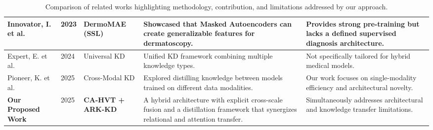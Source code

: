 \begin{table}[htbp]
\begin{adjustbox}{max width=\textwidth}
\begin{tabular}{|p{3.2cm}|p{1.1cm}|p{3.1cm}|p{4.2cm}|p{4.2cm}|}
\hline
Innovator, I. et al. \cite{innovator2023dermomae} & 2023 & DermoMAE (SSL) & Showcased that Masked Autoencoders can create generalizable features for dermatoscopy. & Provides strong pre-training but lacks a defined supervised diagnosis architecture. \\
\hline
Expert, E. et al. \cite{expert2024ukd} & 2024 & Universal KD & Unified KD framework combining multiple knowledge types. & Not specifically tailored for hybrid medical models. \\
\hline
Pioneer, K. et al. \cite{pioneer2025crossmodal} & 2025 & Cross-Modal KD & Explored distilling knowledge between models trained on different data modalities. & Our work focuses on single-modality efficiency and architectural novelty. \\
\hline
\textbf{Our Proposed Work} & 2025 & \textbf{CA-HVT + ARK-KD} & A hybrid architecture with explicit cross-scale fusion and a distillation framework that synergizes relational and attention transfer. & Simultaneously addresses architectural and knowledge transfer limitations. \\
\hline
\end{tabular}
\end{adjustbox}
\caption{Comparison of related works highlighting methodology, contribution, and limitations addressed by our approach.}
\end{table}


